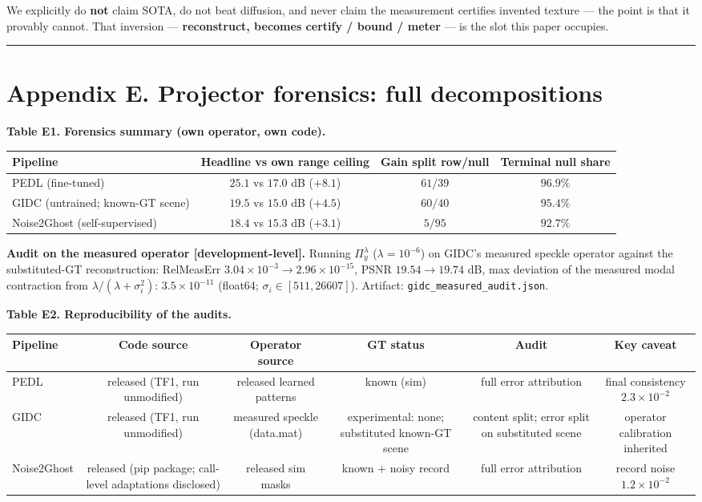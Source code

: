 \documentclass[11pt]{article}
\begin{document}
We explicitly do \textbf{not} claim SOTA, do not beat diffusion, and never claim the measurement certifies invented texture --- the point is that it provably cannot. That inversion --- \textbf{reconstruct, becomes certify / bound / meter} --- is the slot this paper occupies.

\medskip\hrule\medskip

\section*{Appendix E. Projector forensics: full decompositions}

\textbf{Table E1. Forensics summary (own operator, own code).}

\begin{center}\begin{tabular}{lccc}
\toprule
Pipeline & Headline vs own range ceiling & Gain split row/null & Terminal null share \\
\midrule
PEDL (fine-tuned) & $25.1$ vs $17.0$ dB ($+8.1$) & $61/39$ & $96.9\%$ \\
GIDC (untrained; known-GT scene) & $19.5$ vs $15.0$ dB ($+4.5$) & $60/40$ & $95.4\%$ \\
Noise2Ghost (self-supervised) & $18.4$ vs $15.3$ dB ($+3.1$) & $5/95$ & $92.7\%$ \\
\bottomrule
\end{tabular}\end{center}

\textbf{Audit on the measured operator [development-level].} Running $\Pi_y^\lambda$ ($\lambda = 10^{-6}$) on GIDC's measured speckle operator against the substituted-GT reconstruction: RelMeasErr $3.04\times10^{-3} \to 2.96\times10^{-15}$, PSNR $19.54 \to 19.74$ dB, max deviation of the measured modal contraction from $\lambda/(\lambda+\sigma_i^2)$: $3.5\times10^{-11}$ (float64; $\sigma_i \in [511, 26607]$). Artifact: \texttt{gidc\_measured\_audit.json}.

\textbf{Table E2. Reproducibility of the audits.}

\begin{center}\begin{tabular}{lccccc}
\toprule
Pipeline & Code source & Operator source & GT status & Audit & Key caveat \\
\midrule
PEDL & released (TF1, run unmodified) & released learned patterns & known (sim) & full error attribution & final consistency $2.3\times10^{-2}$ \\
GIDC & released (TF1, run unmodified) & measured speckle (data.mat) & experimental: none; substituted known-GT scene & content split; error split on substituted scene & operator calibration inherited \\
Noise2Ghost & released (pip package; call-level adaptations disclosed) & released sim masks & known + noisy record & full error attribution & record noise $1.2\times10^{-2}$ \\
\bottomrule
\end{tabular}\end{center}
\end{document}

